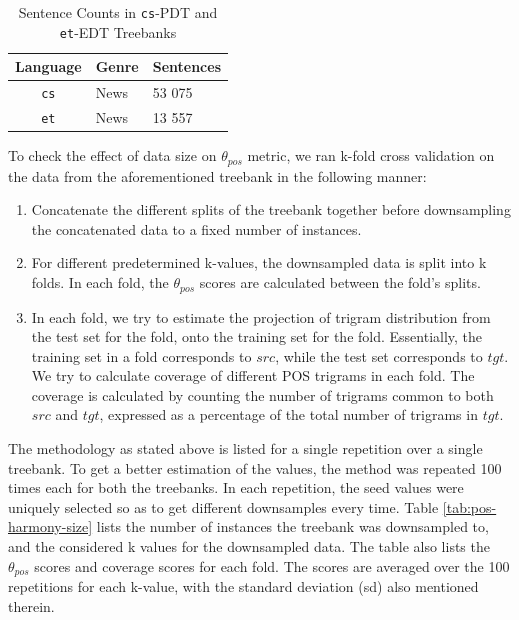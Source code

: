\begin{table}[H]
    \centering
    \begin{tabular}{|c|l|l|}
        \hline
        \textbf{Language} & \textbf{Genre} & \textbf{Sentences}\\
        \hline
        \texttt{cs} & News & 53 075 \\
        \hline
        \texttt{et} & News & 13 557 \\
        \hline
    \end{tabular}
    \caption{Sentence Counts in \texttt{cs}-PDT and \texttt{et}-EDT Treebanks}
    \label{tab:pos-harmony-size-datasize}
\end{table}


To check the effect of data size on $\theta_{pos}$ metric, we ran k-fold cross validation on the data from the aforementioned treebank in the following manner:

\begin{enumerate}
    \item Concatenate the different splits of the treebank together before downsampling the concatenated data to a fixed number of instances.
    \item For different predetermined k-values, the downsampled data is split into k folds. In each fold, the $\theta_{pos}$ scores are calculated between the fold's splits.
    \item In each fold, we try to estimate the projection of trigram distribution from the test set for the fold, onto the training set for the fold. Essentially, the training set in a fold corresponds to $src$, while the test set corresponds to $tgt$. We try to calculate coverage of different POS trigrams in each fold. The coverage is calculated by counting the number of trigrams common to both $src$ and $tgt$, expressed as a percentage of the total number of trigrams in $tgt$.
\end{enumerate}

The methodology as stated above is listed for a single repetition over a single treebank. To get a better estimation of the values, the method was repeated 100 times each for both the treebanks. In each repetition, the seed values were uniquely selected so as to get different downsamples every time. Table \ref{tab:pos-harmony-size} lists the number of instances the treebank was downsampled to, and the considered k values for the downsampled data. The table also lists the $\theta_{pos}$ scores and coverage scores for each fold. The scores are averaged over the 100 repetitions for each k-value, with the standard deviation (sd) also mentioned therein.

